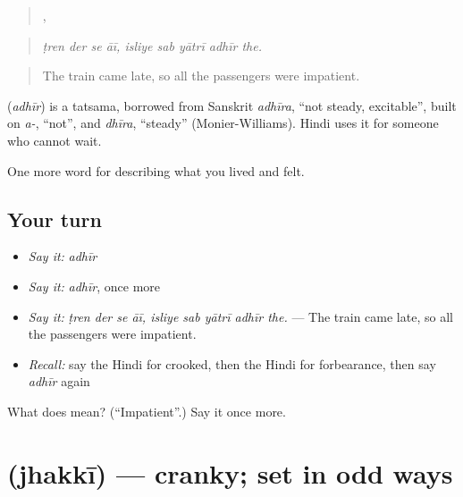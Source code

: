 \begin{quote}
   ,     
\end{quote}

\begin{quote}
\emph{ṭren der se āī, isliye sab yātrī adhīr the.}
\end{quote}

\begin{quote}
The train came late, so all the passengers were impatient.
\end{quote}

\begin{cousinweb}
\textbf{} (\emph{adhīr}) is a tatsama, borrowed from Sanskrit \emph{adhīra}, \textquotedblleft{}not steady, excitable\textquotedblright{}, built on \emph{a-}, \textquotedblleft{}not\textquotedblright{}, and \emph{dhīra}, \textquotedblleft{}steady\textquotedblright{} (Monier-Williams). Hindi uses it for someone who cannot wait.
\end{cousinweb}

\begin{grammarlens}[title={What you've built}]
One more word for describing what you lived and felt.
\end{grammarlens}

\subsection*{Your turn}
\begin{itemize}
\raggedright
  \item \emph{Say it:} \emph{adhīr}
  \item \emph{Say it:} \emph{adhīr}, once more
  \item \emph{Say it:} \emph{ṭren der se āī, isliye sab yātrī adhīr the.} — The train came late, so all the passengers were impatient.
  \item \emph{Recall:} say the Hindi for crooked, then the Hindi for forbearance, then say \emph{adhīr} again
\end{itemize}

\begin{tcolorbox}[breakable,colback=teal!4,colframe=teal!35!black,title={Before you move on}]
What does  mean? (\textquotedblleft{}Impatient\textquotedblright{}.) Say it once more.
\end{tcolorbox}
\section[\texorpdfstring{\hi{झक्की} (jhakkī)}{झक्की (jhakkī)}]{ (jhakkī) — cranky; set in odd ways}


